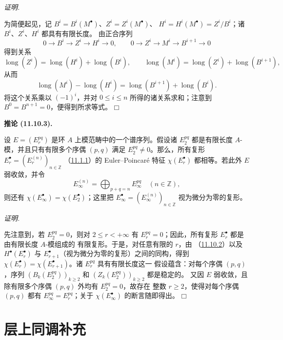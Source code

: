 \documentclass[UTF8,fontset=none,11pt,oneside,openany]{ctexbook}
\providecommand{\square}{\mdlgwhtsquare}
\newenvironment{corollary}[1][]{%
  \par\medskip\noindent\textbf{推论 (#1).}\ %
}{\par}
\newenvironment{proof}{%
  \par\smallskip\noindent\textit{证明.}\ %
}{\hfill$\square$\par}
\let\EGAOriginalLabel\label
\renewcommand{\label}[1]{\phantomsection\EGAOriginalLabel{#1}}
\begin{document}
\begin{proof}
为简便起见，记 $B^i=B^i(M^\bullet)$、$Z^i=Z^i(M^\bullet)$、
$H^i=H^i(M^\bullet)=Z^i/B^i$；诸 $B^i$、$Z^i$、$H^i$ 都具有有限长度。
由正合序列
\[
0\longrightarrow B^i\longrightarrow Z^i\longrightarrow H^i
\longrightarrow0,
\qquad
0\longrightarrow Z^i\longrightarrow M^i\longrightarrow B^{i+1}
\longrightarrow0
\]
得到关系
\[
\operatorname{long}(Z^i)=\operatorname{long}(H^i)+
\operatorname{long}(B^i),
\qquad
\operatorname{long}(M^i)=\operatorname{long}(Z^i)+
\operatorname{long}(B^{i+1}),
\]
从而
\[
\operatorname{long}(M^i)-\operatorname{long}(H^i)=
\operatorname{long}(B^{i+1})+\operatorname{long}(B^i).
\]
将这个关系乘以 $(-1)^i$，并对 $0\leq i\leq n$ 所得的诸关系求和；注意到
$B^0=B^{n+1}=0$，便得到所求等式。
\end{proof}

\begin{corollary}[11.10.3]
\label{0.11.10.3-fr}
设 $E=(E_r^{pq})$ 是环 $A$ 上模范畴中的一个谱序列。假设诸
$E_2^{pq}$ 都是有限长度 $A$-模，并且只有有限多个序偶 $(p,q)$ 满足
$E_2^{pq}\neq0$。那么，所有复形
$E_r^\bullet=(E_r^{(n)})_{n\in\mathbb Z}$
（\hyperref[0.11.1.1-fr]{11.1.1}）的 Euler--Poincaré 特征
$\chi(E_r^\bullet)$ 都相等。若此外 $E$ 弱收敛，并令
\[
E_\infty^{(n)}=\bigoplus_{p+q=n}E_\infty^{pq}\quad(n\in\mathbb Z),
\]
则还有 $\chi(E_\infty^\bullet)=\chi(E_2^\bullet)$；这里把
$E_\infty^\bullet=(E_\infty^{(n)})_{n\in\mathbb Z}$ 视为微分为零的复形。
\end{corollary}

\begin{proof}
先注意到，若 $E_2^{pq}=0$，则对 $2\leq r<+\infty$ 有
$E_r^{pq}=0$；因此，所有复形 $E_r^\bullet$ 都是由有限长度 $A$-模组成的
有限复形。于是，对任意有限的 $r$，由
（\hyperref[0.11.10.2-fr]{11.10.2}）以及 $H^\bullet(E_r^\bullet)$ 与
$E_{r+1}^\bullet$（视为微分为零的复形）之间的同构，得到
$\chi(E_r^\bullet)=\chi(E_{r+1}^\bullet)$。诸 $E_r^{pq}$ 具有有限长度这一
假设蕴含：对每个序偶 $(p,q)$，序列
$(B_k(E_2^{pq}))_{k\geq2}$ 和 $(Z_k(E_2^{pq}))_{k\geq2}$ 都是稳定的。
又因 $E$ 弱收敛，且除有限多个序偶 $(p,q)$ 外均有 $E_2^{pq}=0$，故存在
整数 $r\geq2$，使得对每个序偶 $(p,q)$ 都有
$E_\infty^{pq}=E_r^{pq}$；关于 $\chi(E_\infty^\bullet)$ 的断言随即得出。
\end{proof}

\section{层上同调补充}
\label{section:0.12-fr}
\end{document}
